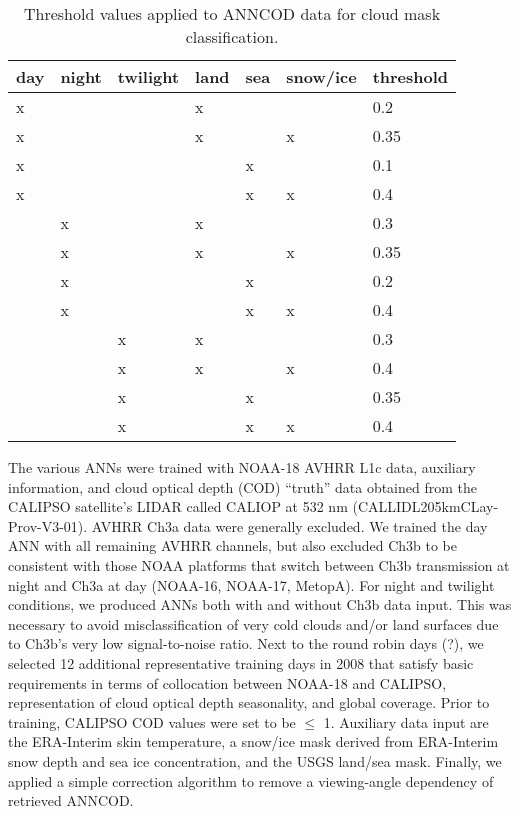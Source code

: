 \begin{table}[h]
  \caption{Threshold values applied to ANNCOD data for cloud mask classification.}
  \begin{tabular}{llllll|l} %
    \hline
    day & night & twilight & land & sea & snow/ice & threshold \\
    \hline
    x   &       &          & x    &     &          & 0.2  \\
    x   &       &          & x    &     & x        & 0.35 \\
    x   &       &          &      & x   &          & 0.1  \\
    x   &       &          &      & x   & x        & 0.4  \\ \hline
    & x     &          & x    &     &          & 0.3  \\
    & x     &          & x    &     & x        & 0.35 \\
    & x     &          &      & x   &          & 0.2  \\
    & x     &          &      & x   & x        & 0.4  \\ \hline
    &       & x        & x    &     &          & 0.3  \\
    &       & x        & x    &     & x        & 0.4  \\
    &       & x        &      & x   &          & 0.35 \\
    &       & x        &      & x   & x        & 0.4  \\ \hline
  \end{tabular}
  \label{tab:ANN_thresholds}
\end{table}

The various ANNs were trained with NOAA-18 AVHRR L1c data, auxiliary information, and cloud optical depth (COD) ``truth'' data obtained from the CALIPSO satellite's LIDAR called CALIOP at 532 nm (\mbox{CAL\textunderscore LID\textunderscore L2\textunderscore 05kmCLay-Prov-V3-01}). AVHRR Ch3a data were generally excluded. We trained the day ANN with all remaining AVHRR channels, but also excluded Ch3b to be consistent with those NOAA platforms that switch between Ch3b transmission at night and Ch3a at day (NOAA-16, NOAA-17, MetopA). For night and twilight conditions, we produced ANNs both with and without Ch3b data input. This was necessary to avoid misclassification of very cold clouds and/or land surfaces due to Ch3b's very low signal-to-noise ratio. Next to the round robin days (?), we selected 12 additional representative training days in 2008 that satisfy basic requirements in terms of collocation between NOAA-18 and CALIPSO, representation of cloud optical depth seasonality, and global coverage. Prior to training, CALIPSO COD values were set to be $\le$ 1. Auxiliary data input are the ERA-Interim skin temperature, a snow/ice mask derived from ERA-Interim snow depth and sea ice concentration, and the USGS land/sea mask. Finally, we applied a simple correction algorithm to remove a viewing-angle dependency of retrieved ANNCOD.

